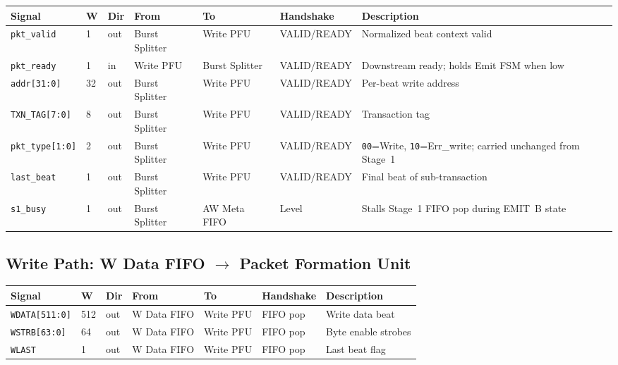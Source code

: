 \documentclass[11pt,a4paper]{article}
\begin{document}
\begin{tabularx}{\textwidth}{L{3.0cm} C{0.8cm} C{1.0cm} L{2.2cm} L{2.2cm} L{2.0cm} X}
\toprule
\textbf{Signal} & \textbf{W} & \textbf{Dir} & \textbf{From} & \textbf{To} & \textbf{Handshake} & \textbf{Description} \\
\midrule
\texttt{pkt\_valid}      & 1  & out & Burst Splitter & Write PFU & VALID/READY & Normalized beat context valid \\
\texttt{pkt\_ready}      & 1  & in  & Write PFU      & Burst Splitter & VALID/READY & Downstream ready; holds Emit FSM when low \\
\texttt{addr[31:0]}      & 32 & out & Burst Splitter & Write PFU & VALID/READY & Per-beat write address \\
\texttt{TXN\_TAG[7:0]}   & 8  & out & Burst Splitter & Write PFU & VALID/READY & Transaction tag \\
\texttt{pkt\_type[1:0]}  & 2  & out & Burst Splitter & Write PFU & VALID/READY & \texttt{00}=Write, \texttt{10}=Err\_write; carried unchanged from Stage~1 \\
\texttt{last\_beat}      & 1  & out & Burst Splitter & Write PFU & VALID/READY & Final beat of sub-transaction \\
\texttt{s1\_busy}        & 1  & out & Burst Splitter & AW Meta FIFO & Level & Stalls Stage~1 FIFO pop during EMIT~B state \\
\bottomrule
\end{tabularx}

\subsection{Write Path: W Data FIFO $\rightarrow$ Packet Formation Unit}

\begin{tabularx}{\textwidth}{L{3.0cm} C{0.8cm} C{1.0cm} L{2.2cm} L{2.2cm} L{2.0cm} X}
\toprule
\textbf{Signal} & \textbf{W} & \textbf{Dir} & \textbf{From} & \textbf{To} & \textbf{Handshake} & \textbf{Description} \\
\midrule
\texttt{WDATA[511:0]}  & 512 & out & W Data FIFO & Write PFU & FIFO pop & Write data beat \\
\texttt{WSTRB[63:0]}   & 64  & out & W Data FIFO & Write PFU & FIFO pop & Byte enable strobes \\
\texttt{WLAST}         & 1   & out & W Data FIFO & Write PFU & FIFO pop & Last beat flag \\
\bottomrule
\end{tabularx}
\end{document}
